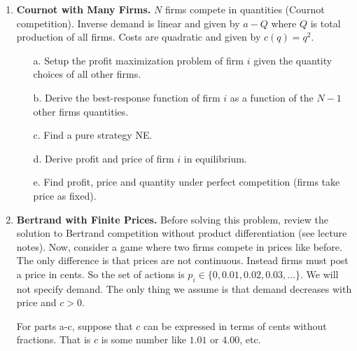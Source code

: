 \documentclass{article}
\begin{document}
\begin{enumerate}
    \item \textbf{Cournot with Many Firms.} $N$ firms compete in quantities (Cournot competition). Inverse demand is linear and given by $a-Q$ where $Q$ is total production of all firms. Costs are quadratic and given by $c(q)=q^2$.
    \begin{enumerate}
        \item[a.] Setup the profit maximization problem of firm $i$ given the quantity choices of all other firms.
        
        \vspace{4cm}
        
        \item[b.] Derive the best-response function of firm $i$ as a function of  the $N-1$ other firms quantities.
        
        \vspace{6cm}
        
        \item[c.] Find a pure strategy NE.
        
        \vspace{6cm}
        
        \item[d.] Derive profit and price of firm $i$ in equilibrium.
        
        \vspace{6cm}
        
        \item[e.] Find profit, price and quantity under perfect competition (firms take price as fixed).
        
        \vspace{6cm}
        
     \end{enumerate}
    \item \textbf{Bertrand with Finite Prices.} Before solving this problem, review the solution to Bertrand competition without product differentiation (see lecture notes). Now, consider a game where two firms compete in prices like before. The only difference is that prices are not continuous. Instead firms must post a price in cents. So the set of actions is $p_i \in \{0, 0.01, 0.02,0.03,...\}$. We will not specify demand. The only thing we assume is that demand decreases with price and $c>0$.
    
    For parts a-c, suppose that $c$ can be expressed in terms of cents without fractions. That is $c$ is some number like $1.01$ or $4.00$, etc.
    

\end{enumerate}
\end{document}
